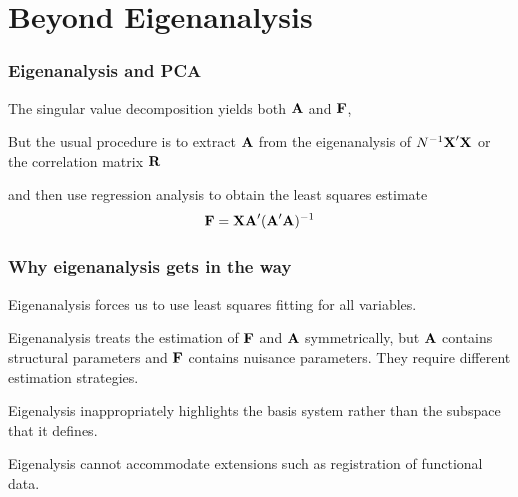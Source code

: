 \documentclass[11pt]{beamer}
\begin{document}

\section{Beyond Eigenanalysis}


\begin{frame}

\frametitle{Eigenanalysis and PCA}

\bi
  \item The singular value decomposition yields both $\mbox{\bf A}$ and $\mbox{\bf F}$,
  \item But the usual procedure is to extract $\mbox{\bf A}$ from the eigenanalysis of $N^{-1} \mbox{\bf X}' \mbox{\bf X}$
  or the correlation matrix $\mbox{\bf R}$
  \item and then use regression analysis to obtain the least squares estimate
  \[
    \mbox{\bf F} = \mbox{\bf X} \mbox{\bf A}' (\mbox{\bf A}' \mbox{\bf A})^{-1}
  \]
\ei

\end{frame}


\begin{frame}

\frametitle{Why eigenanalysis gets in the way}

\bi
  \item Eigenanalysis forces us to use least squares fitting for all variables.
  \item Eigenanalysis treats the estimation of $\mbox{\bf F}$ and $\mbox{\bf A}$ symmetrically, but $\mbox{\bf A}$ contains structural parameters and $\mbox{\bf F}$ contains nuisance parameters.  They require different estimation strategies.
  \item Eigenalysis inappropriately highlights the basis system rather than the subspace that it defines.
  \item Eigenalysis cannot accommodate extensions such as registration of functional data.
\ei

\end{frame}

\end{document}
